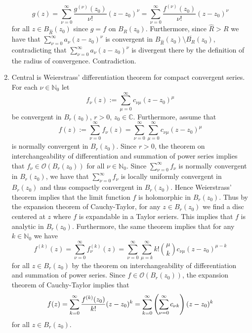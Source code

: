 \begin{enumerate}[label = \textbf{Exercise \arabic*.},wide = 0pt, itemsep=1.5ex]
		\begin{equation}
			g(z) = \sum_{\nu = 0}^\infty \frac{g^{(\nu)}(z_0)}{\nu !}(z - z_0)^\nu = \sum_{\nu = 0}^\infty \frac{f^{(\nu)}(z_0)}{\nu !}(z - z_0)^\nu
		\end{equation}
		\noindent for all $z \in B_{\hat{R}}(z_0)$ since $g = f$ on $B_R(z_0)$. Furthermore, since $\hat{R} > R$ we have that $\sum_{\nu = 0}^\infty a_\nu(z - z_0)^\nu$ is convergent in $B_{\hat{R}}(z_0) \setminus \overline{B_R}(z_0)$, contradicting that $\sum_{\nu = 0}^\infty a_{\nu} (z - z_0)^\nu$ is divergent there by the definition of the radius of convergence. Contradiction.

	\item Central is Weierstrass' differentiation theorem for compact convergent series. For each $\nu \in \mathbb{N}_0$ let
		\begin{equation}
			f_\nu(z) := \sum_{\mu = 0}^\infty c_{\nu \mu}(z - z_0)^\mu
		\end{equation}
		\noindent be convergent in $B_r(z_0)$, $r > 0$, $z_0 \in \mathbb{C}$. Furthermore, assume that
		\begin{equation}
			f(z) := \sum_{\nu = 0}^\infty f_\nu(z) = \sum_{\nu = 0}^\infty \sum_{\mu = 0}^\infty c_{\nu \mu}(z - z_0)^\mu
		\end{equation}
		\noindent is normally convergent in $B_r(z_0)$. Since $r > 0$, the theorem on interchangeability of differentiation and summation of power series implies that $f_\nu \in \mathcal{O}(B_r(z_0))$ for all $\nu \in \mathbb{N}_0$. Since $\sum_{\nu = 0}^\infty f_\nu$ is normally convergent in $B_r(z_0)$, we have that $\sum_{\nu = 0}^\infty f_\nu$ is locally uniformly convergent in $B_r(z_0)$ and thus compactly convergent in $B_r(z_0)$. Hence Weierstrass' theorem implies that the limit function $f$ is holomorphic in $B_r(z_0)$. Thus by the expansion theorem of Cauchy-Taylor, for any $z \in B_r(z_0)$ we find a disc centered at $z$ where $f$ is expandable in a Taylor seriers. This implies that $f$ is analytic in $B_r(z_0)$. Furthermore, the same theorem implies that for any $k \in \mathbb{N}_0$ we have
		\begin{equation}
			f^{(k)}(z) = \sum_{\nu = 0}^\infty f_\nu^{(k)}(z) = \sum_{\nu = 0}^\infty \sum_{\mu = k}^\infty k! {\mu \choose k}c_{\nu \mu}(z - z_0)^{\mu - k} 
		\end{equation}
		\noindent for all $z \in B_r(z_0)$ by the theorem on interchangeability of differentiation and summation of power series. Since $f \in \mathcal{O}(B_r(z_0))$, the expansion theorem of Cauchy-Taylor implies that 
		\begin{equation}
			f(z) = \sum_{k = 0}^\infty \frac{f^{(k)}(z_0)}{k !} (z - z_0)^k = \sum_{k = 0}^\infty \del[4]{\sum_{\nu = 0}^\infty c_{\nu k}} (z - z_0)^k
		\end{equation}
		\noindent for all $z \in B_r(z_0)$.
\end{enumerate}
\printbibliography


